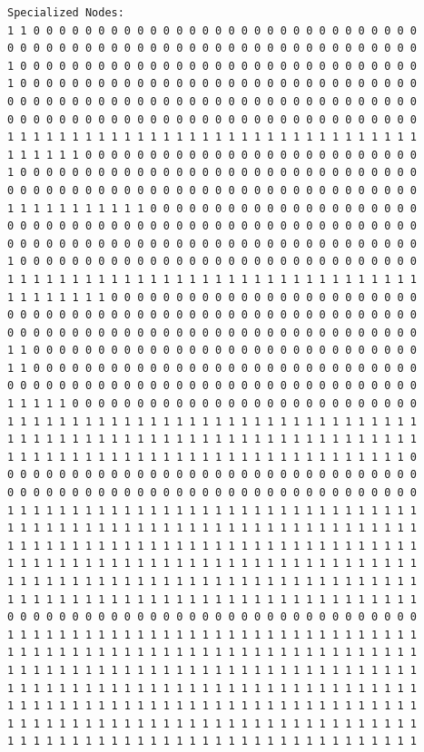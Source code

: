 \documentclass [10 pt, a4 paper]{report}
\begin{document}
\begin{lstlisting}[caption=Output of the simulation once it is finished, label={lst:code1}, frame=single]
Specialized Nodes:
1 1 0 0 0 0 0 0 0 0 0 0 0 0 0 0 0 0 0 0 0 0 0 0 0 0 0 0 0 0 0 0
0 0 0 0 0 0 0 0 0 0 0 0 0 0 0 0 0 0 0 0 0 0 0 0 0 0 0 0 0 0 0 0
1 0 0 0 0 0 0 0 0 0 0 0 0 0 0 0 0 0 0 0 0 0 0 0 0 0 0 0 0 0 0 0
1 0 0 0 0 0 0 0 0 0 0 0 0 0 0 0 0 0 0 0 0 0 0 0 0 0 0 0 0 0 0 0
0 0 0 0 0 0 0 0 0 0 0 0 0 0 0 0 0 0 0 0 0 0 0 0 0 0 0 0 0 0 0 0
0 0 0 0 0 0 0 0 0 0 0 0 0 0 0 0 0 0 0 0 0 0 0 0 0 0 0 0 0 0 0 0
1 1 1 1 1 1 1 1 1 1 1 1 1 1 1 1 1 1 1 1 1 1 1 1 1 1 1 1 1 1 1 1
1 1 1 1 1 1 0 0 0 0 0 0 0 0 0 0 0 0 0 0 0 0 0 0 0 0 0 0 0 0 0 0
1 0 0 0 0 0 0 0 0 0 0 0 0 0 0 0 0 0 0 0 0 0 0 0 0 0 0 0 0 0 0 0
0 0 0 0 0 0 0 0 0 0 0 0 0 0 0 0 0 0 0 0 0 0 0 0 0 0 0 0 0 0 0 0
1 1 1 1 1 1 1 1 1 1 1 0 0 0 0 0 0 0 0 0 0 0 0 0 0 0 0 0 0 0 0 0
0 0 0 0 0 0 0 0 0 0 0 0 0 0 0 0 0 0 0 0 0 0 0 0 0 0 0 0 0 0 0 0
0 0 0 0 0 0 0 0 0 0 0 0 0 0 0 0 0 0 0 0 0 0 0 0 0 0 0 0 0 0 0 0
1 0 0 0 0 0 0 0 0 0 0 0 0 0 0 0 0 0 0 0 0 0 0 0 0 0 0 0 0 0 0 0
1 1 1 1 1 1 1 1 1 1 1 1 1 1 1 1 1 1 1 1 1 1 1 1 1 1 1 1 1 1 1 1
1 1 1 1 1 1 1 1 0 0 0 0 0 0 0 0 0 0 0 0 0 0 0 0 0 0 0 0 0 0 0 0
0 0 0 0 0 0 0 0 0 0 0 0 0 0 0 0 0 0 0 0 0 0 0 0 0 0 0 0 0 0 0 0
0 0 0 0 0 0 0 0 0 0 0 0 0 0 0 0 0 0 0 0 0 0 0 0 0 0 0 0 0 0 0 0
1 1 0 0 0 0 0 0 0 0 0 0 0 0 0 0 0 0 0 0 0 0 0 0 0 0 0 0 0 0 0 0
1 1 0 0 0 0 0 0 0 0 0 0 0 0 0 0 0 0 0 0 0 0 0 0 0 0 0 0 0 0 0 0
0 0 0 0 0 0 0 0 0 0 0 0 0 0 0 0 0 0 0 0 0 0 0 0 0 0 0 0 0 0 0 0
1 1 1 1 1 0 0 0 0 0 0 0 0 0 0 0 0 0 0 0 0 0 0 0 0 0 0 0 0 0 0 0
1 1 1 1 1 1 1 1 1 1 1 1 1 1 1 1 1 1 1 1 1 1 1 1 1 1 1 1 1 1 1 1
1 1 1 1 1 1 1 1 1 1 1 1 1 1 1 1 1 1 1 1 1 1 1 1 1 1 1 1 1 1 1 1
1 1 1 1 1 1 1 1 1 1 1 1 1 1 1 1 1 1 1 1 1 1 1 1 1 1 1 1 1 1 1 0
0 0 0 0 0 0 0 0 0 0 0 0 0 0 0 0 0 0 0 0 0 0 0 0 0 0 0 0 0 0 0 0
0 0 0 0 0 0 0 0 0 0 0 0 0 0 0 0 0 0 0 0 0 0 0 0 0 0 0 0 0 0 0 0
1 1 1 1 1 1 1 1 1 1 1 1 1 1 1 1 1 1 1 1 1 1 1 1 1 1 1 1 1 1 1 1
1 1 1 1 1 1 1 1 1 1 1 1 1 1 1 1 1 1 1 1 1 1 1 1 1 1 1 1 1 1 1 1
1 1 1 1 1 1 1 1 1 1 1 1 1 1 1 1 1 1 1 1 1 1 1 1 1 1 1 1 1 1 1 1
1 1 1 1 1 1 1 1 1 1 1 1 1 1 1 1 1 1 1 1 1 1 1 1 1 1 1 1 1 1 1 1
1 1 1 1 1 1 1 1 1 1 1 1 1 1 1 1 1 1 1 1 1 1 1 1 1 1 1 1 1 1 1 1
1 1 1 1 1 1 1 1 1 1 1 1 1 1 1 1 1 1 1 1 1 1 1 1 1 1 1 1 1 1 1 1
0 0 0 0 0 0 0 0 0 0 0 0 0 0 0 0 0 0 0 0 0 0 0 0 0 0 0 0 0 0 0 0
1 1 1 1 1 1 1 1 1 1 1 1 1 1 1 1 1 1 1 1 1 1 1 1 1 1 1 1 1 1 1 1
1 1 1 1 1 1 1 1 1 1 1 1 1 1 1 1 1 1 1 1 1 1 1 1 1 1 1 1 1 1 1 1
1 1 1 1 1 1 1 1 1 1 1 1 1 1 1 1 1 1 1 1 1 1 1 1 1 1 1 1 1 1 1 1
1 1 1 1 1 1 1 1 1 1 1 1 1 1 1 1 1 1 1 1 1 1 1 1 1 1 1 1 1 1 1 1
1 1 1 1 1 1 1 1 1 1 1 1 1 1 1 1 1 1 1 1 1 1 1 1 1 1 1 1 1 1 1 1
1 1 1 1 1 1 1 1 1 1 1 1 1 1 1 1 1 1 1 1 1 1 1 1 1 1 1 1 1 1 1 1
1 1 1 1 1 1 1 1 1 1 1 1 1 1 1 1 1 1 1 1 1 1 1 1 1 1 1 1 1 1 1 1

\end{lstlisting}
\end{document}
